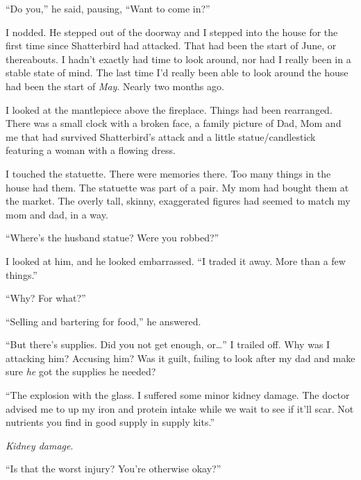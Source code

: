 ``Do you,'' he said, pausing, ``Want to come in?''



I nodded.  He stepped out of the doorway and I stepped into the house for the first time since Shatterbird had attacked.  That had been the start of June, or thereabouts.  I hadn't exactly had time to look around, nor had I really been in a stable state of mind.  The last time I'd really been able to look around the house had been the start of \emph{May}.  Nearly two months ago.



I looked at the mantlepiece above the fireplace.  Things had been rearranged.  There was a small clock with a broken face, a family picture of Dad, Mom and me that had survived Shatterbird's attack and a little statue/candlestick featuring a woman with a flowing dress.



I touched the statuette.  There were memories there.  Too many things in the house had them.  The statuette was part of a pair.  My mom had bought them at the market.  The overly tall, skinny, exaggerated figures had seemed to match my mom and dad, in a way.



``Where's the husband statue?  Were you robbed?''



I looked at him, and he looked embarrassed.  ``I traded it away.  More than a few things.''



``Why?  For what?''



``Selling and bartering for food,'' he answered.



``But there's supplies.  Did you not get enough, or\ldots'' I trailed off.  Why was I attacking him? Accusing him?  Was it guilt, failing to look after my dad and make sure \emph{he} got the supplies he needed?



``The explosion with the glass.  I suffered some minor kidney damage.  The doctor advised me to up my iron and protein intake while we wait to see if it'll scar.  Not nutrients you find in good supply in supply kits.''



\emph{Kidney damage}.



``Is that the worst injury?  You're otherwise okay?''



